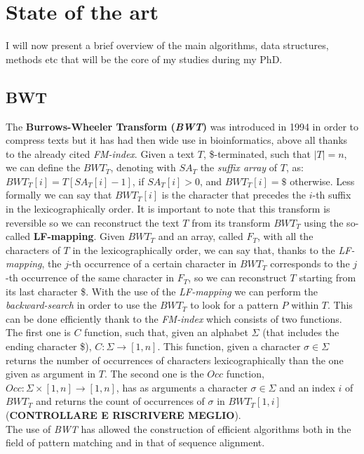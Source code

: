 \documentclass[a4paper,12pt, oneside]{article}
\begin{document}
\section{State of the art}
I will now present a brief overview of the main algorithms, data structures,
methods etc that will be the core of my studies during my PhD. 
\subsection*{BWT}
The \textbf{Burrows-Wheeler Transform (\textit{BWT})} \cite{bwt} was introduced
in 1994 in order to compress texts but it has had then wide use in
bioinformatics, above all thanks to the already cited \textit{FM-index}. Given a
text $T$, \$-terminated, such that $|T|=n$, we can define the $BWT_T$, denoting
with $SA_T$ the \textit{suffix array} of $T$, as:
$BWT_T[i] = T[SA_T[i]-1]$, if $SA_T[i]>0$, and $BWT_T[i] = \$ $ otherwise. Less
formally we can say that $BWT_T[i]$ is the character that precedes the $i$-th
suffix in the lexicographically order. It is important to note that this
transform is reversible so we can reconstruct the text $T$ from its transform
$BWT_T$ using the so-called \textbf{LF-mapping}. Given $BWT_T$ and an array,
called $F_T$, with all the characters of $T$ in the lexicographically order, we
can say that, thanks to the \textit{LF-mapping}, the $j$-th occurrence of a
certain character in $BWT_T$ corresponds to the $j$-th occurrence of the same
character in $F_T$, so we can reconstruct $T$ starting from its last character
\$. With the use of the \textit{LF-mapping} we can perform the
\textit{backward-search} in order to use the $BWT_T$ to look for a pattern $P$
within $T$. This can be done efficiently thank to the \textit{FM-index} which
consists of two functions. The first one is $C$ function, such that, given an
alphabet $\Sigma$ (that includes the ending character \$),
$C:\Sigma\to[1,n]$. This function, given a character $\sigma\in \Sigma$ returns
the number of occurrences of characters lexicographically than the one given as
argument in $T$. The second one is the $Occ$ function,
$Occ:\Sigma\times[1,n]\to[1,n]$, has as arguments a character $\sigma\in\Sigma$
and an index $i$ of $BWT_T$ and returns the count of occurrences of $\sigma$ in
$BWT_T[1,i]$ (\textbf{CONTROLLARE E RISCRIVERE MEGLIO}).\\
The use of \textit{BWT} has allowed the construction of efficient algorithms
both in the field of pattern matching and in that of sequence alignment. 
\end{document}
